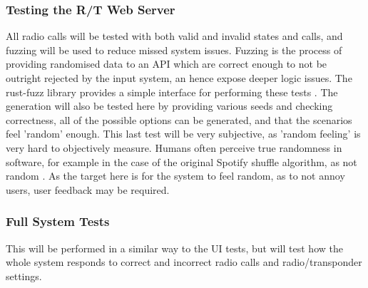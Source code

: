 \subsubsection{Testing the R/T Web Server}
All radio calls will be tested with both valid and invalid states and calls, and fuzzing will be used to reduce missed system issues. Fuzzing is the process of providing randomised data to an API which are correct enough to not be outright rejected by the input system, an hence expose deeper logic issues. The rust-fuzz library provides a simple interface for performing these tests \cite{rust-fuzz}. The generation will also be tested here by providing various seeds and checking correctness, all of the possible options can be generated, and that the scenarios feel 'random' enough. This last test will be very subjective, as 'random feeling' is very hard to objectively measure. Humans often perceive true randomness in software, for example in the case of the original Spotify shuffle algorithm, as not random \cite{spotify-shuffle}. As the target here is for the system to feel random, as to not annoy users, user feedback may be required.

\subsubsection{Full System Tests}
This will be performed in a similar way to the UI tests, but will test how the whole system responds to correct and incorrect radio calls and radio/transponder settings. 